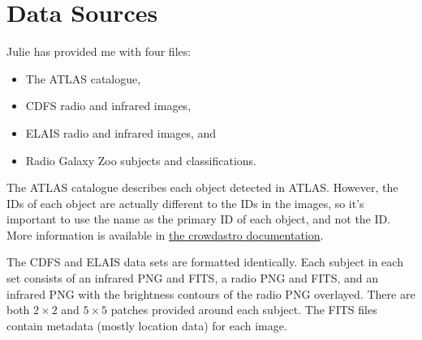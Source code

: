 \documentclass[a4paper]{article}
\begin{document}
    \section{Data Sources}

        Julie has provided me with four files:
        \begin{itemize}
            \item The ATLAS catalogue,
            \item CDFS radio and infrared images,
            \item ELAIS radio and infrared images, and
            \item Radio Galaxy Zoo subjects and classifications.
        \end{itemize}

        The ATLAS catalogue describes each object detected in ATLAS. However, the IDs of each object are actually different to the IDs in the images, so it's important to use the name as the primary ID of each object, and not the ID. More information is available in \href{https://github.com/chengsoonong/crowdastro/blob/master/docs/datasets/atlas.md}{the crowdastro documentation}.

        The CDFS and ELAIS data sets are formatted identically. Each subject in each set consists of an infrared PNG and FITS, a radio PNG and FITS, and an infrared PNG with the brightness contours of the radio PNG overlayed. There are both $2 \times 2$ and $5 \times 5$ patches provided around each subject. The FITS files contain metadata (mostly location data) for each image.

    
    
\end{document}
